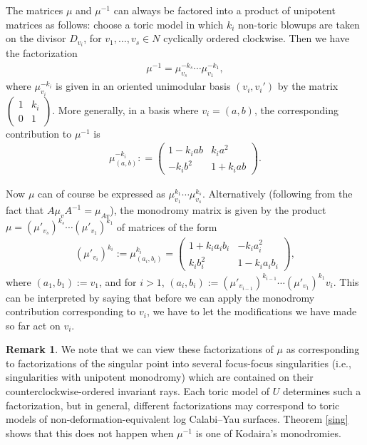 \documentclass[11pt]{article}
\numberwithin{equation}{section}
\numberwithin{figure}{section}
\numberwithin{table}{section}
\theoremstyle{definition}
\newtheorem{rmk}[thm]{Remark}
\begin{document}
The matrices $\mu$ and $\mu^{-1}$ can always be factored into a product of unipotent matrices as follows: choose a toric model in which $k_i$ non-toric blowups are taken on the divisor $D_{v_i}$, for $v_1,\dots,v_s\in N$ cyclically ordered clockwise. Then we have the factorization
\begin{align}
	\mu^{-1} = \mu_{v_s}^{-k_s} \cdots \mu_{v_1}^{-k_1},
\end{align}
where $\mu_{v_i}^{-k_i}$ is given in an oriented unimodular basis $(v_i,v_i')$ by the matrix $	\left(\begin{smallmatrix}
		1 &k_i \\
		0 &1
		\end{smallmatrix}\right)$.
 More generally, in a basis where $v_i = (a,b)$, the corresponding contribution to $\mu^{-1}$ is
\begin{gather}\label{genmut}
	\mu_{(a,b)}^{-k_i} :
		= \left(\begin{matrix}
		1- k_i a b &k_i a^2 \\
		-k_i b^2 &1+k_i a b
		\end{matrix}\right).
\end{gather}

Now $\mu$ can of course be expressed as $\mu_{v_1}^{k_1} \cdots \mu_{v_s}^{k_s}$. Alternatively (following from the fact that $A\mu_v A^{-1}=\mu_{Av}$), the monodromy matrix is given by the product $\mu=(\mu'_{v_s})^{k_s} \cdots (\mu'_{v_1})^{k_1}$ of matrices of the form
\begin{align}\label{hardmu}
	(\mu'_{v_i})^{k_i}:=\mu_{(a_i,b_i)}^{k_i}
		= \left(\begin{matrix}
		1+ k_i a_i b_i &-k_i a_i^2 \\
		k_i b_i^2 &1-k_i a_i b_i
		\end{matrix}\right),
\end{align}
where $(a_1,b_1):=v_1$, and for $i>1$, $(a_i,b_i):=(\mu'_{v_{i-1}})^{k_{i-1}}\cdots (\mu'_{v_1})^{k_1} v_i$. This can be interpreted by saying that before we can apply the monodromy contribution corresponding to $v_i$, we have to let the modifications we have made so far act on $v_i$.

\begin{rmk}\label{factor}We note that we can view these factorizations of $\mu$ as corresponding to factorizations of the singular point into several focus-focus singularities (i.e., singularities with unipotent monodromy) which are contained on their counterclockwise-ordered invariant rays. Each toric model of $U$ determines such a factorization, but in general, different factorizations may correspond to toric models of non-deformation-equivalent log Calabi--Yau surfaces. Theorem \ref{sing} shows that this does not happen when $\mu^{-1}$ is one of Kodaira's monodromies.
\end{rmk}
\end{document}
